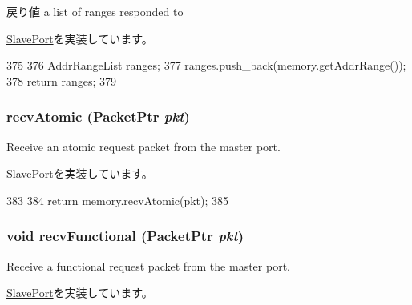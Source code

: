 \begin{DoxyReturn}{戻り値}
a list of ranges responded to 
\end{DoxyReturn}


\hyperlink{classSlavePort_a6e967f8921e80748eb2be35b6b481a7e}{SlavePort}を実装しています。


\begin{DoxyCode}
375 {
376     AddrRangeList ranges;
377     ranges.push_back(memory.getAddrRange());
378     return ranges;
379 }
\end{DoxyCode}
\hypertarget{classDRAMSim2_1_1MemoryPort_a5f0b4c4a94f6b0053f9d7a4eb9c2518a}{
\subsubsection[{recvAtomic}]{ recvAtomic ({\bf PacketPtr} {\em pkt})}}
\label{classDRAMSim2_1_1MemoryPort_a5f0b4c4a94f6b0053f9d7a4eb9c2518a}
Receive an atomic request packet from the master port. 

\hyperlink{classSlavePort_a428ab07671bc9372dc44a2487b12a726}{SlavePort}を実装しています。


\begin{DoxyCode}
383 {
384     return memory.recvAtomic(pkt);
385 }
\end{DoxyCode}
\hypertarget{classDRAMSim2_1_1MemoryPort_aeefa907fb6d6a787e6dab90e8138ea90}{
\subsubsection[{recvFunctional}]{\setlength{\rightskip}{0pt plus 5cm}void recvFunctional ({\bf PacketPtr} {\em pkt})}}
\label{classDRAMSim2_1_1MemoryPort_aeefa907fb6d6a787e6dab90e8138ea90}
Receive a functional request packet from the master port. 

\hyperlink{classSlavePort_a6a3d6f2e5dab6bed16d53d9e7c17378d}{SlavePort}を実装しています。


